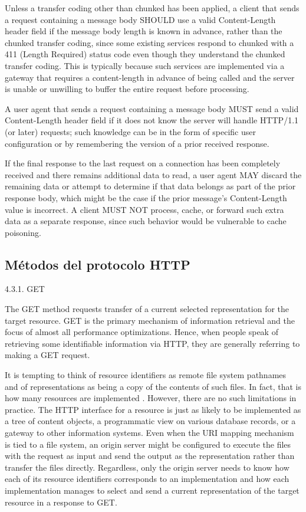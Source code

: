Unless a transfer coding other than chunked has been applied, a
client that sends a request containing a message body SHOULD use a
valid Content-Length header field if the message body length is known
in advance, rather than the chunked transfer coding, since some
existing services respond to chunked with a 411 (Length Required)
status code even though they understand the chunked transfer coding.
This is typically because such services are implemented via a gateway
that requires a content-length in advance of being called and the
server is unable or unwilling to buffer the entire request before
processing.

A user agent that sends a request containing a message body MUST send
a valid Content-Length header field if it does not know the server
will handle HTTP/1.1 (or later) requests; such knowledge can be in
the form of specific user configuration or by remembering the version
of a prior received response.

If the final response to the last request on a connection has been
completely received and there remains additional data to read, a user
agent MAY discard the remaining data or attempt to determine if that
data belongs as part of the prior response body, which might be the
case if the prior message's Content-Length value is incorrect.  A
client MUST NOT process, cache, or forward such extra data as a
separate response, since such behavior would be vulnerable to cache
poisoning.


\subsection{Métodos del protocolo HTTP}
4.3.1.  GET

   The GET method requests transfer of a current selected representation
   for the target resource.  GET is the primary mechanism of information
   retrieval and the focus of almost all performance optimizations.
   Hence, when people speak of retrieving some identifiable information
   via HTTP, they are generally referring to making a GET request.

   It is tempting to think of resource identifiers as remote file system
   pathnames and of representations as being a copy of the contents of
   such files.  In fact, that is how many resources are implemented 
   .  However, there are
   no such limitations in practice.  The HTTP interface for a resource
   is just as likely to be implemented as a tree of content objects, a
   programmatic view on various database records, or a gateway to other
   information systems.  Even when the URI mapping mechanism is tied to
   a file system, an origin server might be configured to execute the
   files with the request as input and send the output as the
   representation rather than transfer the files directly.  Regardless,
   only the origin server needs to know how each of its resource
   identifiers corresponds to an implementation and how each
   implementation manages to select and send a current representation of
   the target resource in a response to GET.

